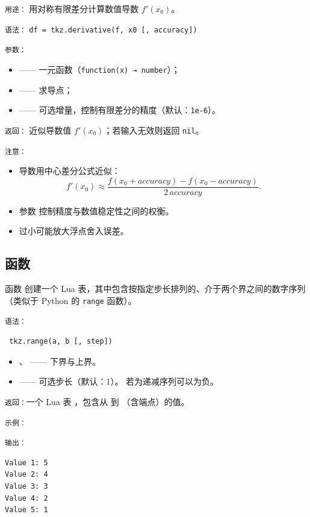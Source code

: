 \texttt{用途：}
用对称有限差分计算数值导数 \( f'(x_0) \)。

\medskip
\texttt{语法：}
\verb|df = tkz.derivative(f, x0 [, accuracy])|

\medskip
\texttt{参数：}
\begin{itemize}
  \item {} —— 一元函数（\texttt{function(x) → number}）；
  \item {} —— 求导点；
  \item {} —— 可选增量，控制有限差分的精度（默认：\texttt{1e-6}）。
\end{itemize}

\medskip
\texttt{返回：}
近似导数值 \( f'(x_0) \)；若输入无效则返回 \texttt{nil}。


\medskip
\texttt{注意：}
\begin{itemize}
  \item 导数用中心差分公式近似：
  \[
     f'(x_0) \approx \frac{f(x_0 + accuracy) - f(x_0 - accuracy)}{2\,accuracy}.
  \]
  \item 参数  控制精度与数值稳定性之间的权衡。
  \item {} 过小可能放大浮点舍入误差。
\end{itemize}

\subsection{函数 }
\label{sub:tkz_range}

函数  创建一个 Lua 表，其中包含按指定步长排列的、介于两个界之间的数字序列（类似于 Python 的 \texttt{range} 函数）。

\texttt{语法：}
\begin{verbatim}
 tkz.range(a, b [, step])
\end{verbatim}

\begin{itemize}
  \item {}、 —— 下界与上界。
  \item {} —— 可选步长（默认：1）。
        若为递减序列可以为负。
\end{itemize}

\texttt{返回：}一个 Lua 表 ，包含从  到 （含端点）的值。

\medskip
\texttt{示例：}
\begin{tkzexample}
\end{tkzexample}

\texttt{输出：}
\begin{verbatim}
Value 1: 5
Value 2: 4
Value 3: 3
Value 4: 2
Value 5: 1
\end{verbatim}

\endinput
